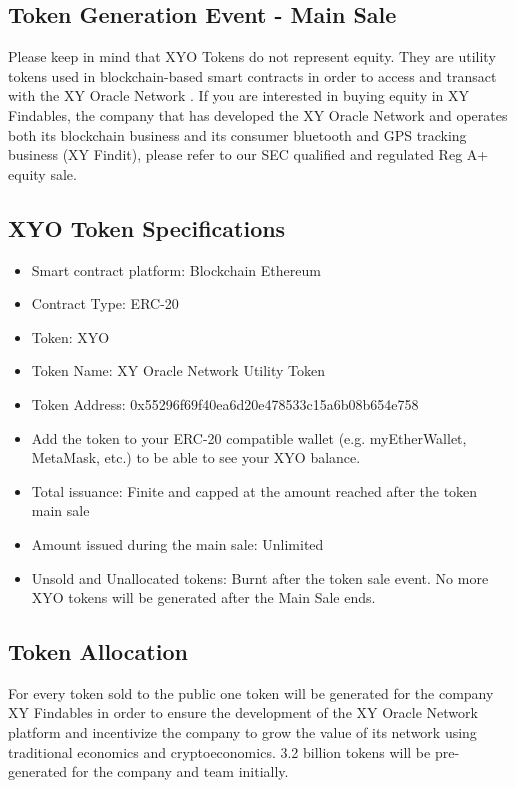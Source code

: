 \documentclass{article}
\begin{document}
\subsection {Token Generation Event - Main Sale}
Please keep in mind that XYO Tokens do not represent equity. They are utility tokens used in blockchain-based smart contracts in order to access and transact with the XY Oracle Network . If you are interested in buying equity in XY Findables, the company that has developed the XY Oracle Network and operates both its blockchain business and its consumer bluetooth and GPS tracking business (XY Findit), please refer to our SEC qualified and regulated Reg A+ equity sale.

\subsection {XYO Token Specifications}
\begin{itemize}
\item Smart contract platform: Blockchain Ethereum
\item Contract Type: ERC-20
\item Token: XYO
\item Token Name: XY Oracle Network Utility Token
\item Token Address: 0x55296f69f40ea6d20e478533c15a6b08b654e758
\item Add the token to your ERC-20 compatible wallet (e.g. myEtherWallet, MetaMask, etc.)  to be able to see your XYO balance.
\item Total issuance: Finite and capped at the amount reached after the token main sale
\item Amount issued during the main sale: Unlimited
\item Unsold and Unallocated tokens: Burnt after the token sale event. No more XYO tokens will be generated after the Main Sale ends.
\end{itemize}

\subsection {Token Allocation}
For every token sold to the public one token will be generated for the company XY Findables in order to ensure the development of the XY Oracle Network platform and incentivize the company to grow the value of its network using traditional economics and cryptoeconomics. 3.2 billion tokens will be pre-generated for the company and team initially.
\end{document}
